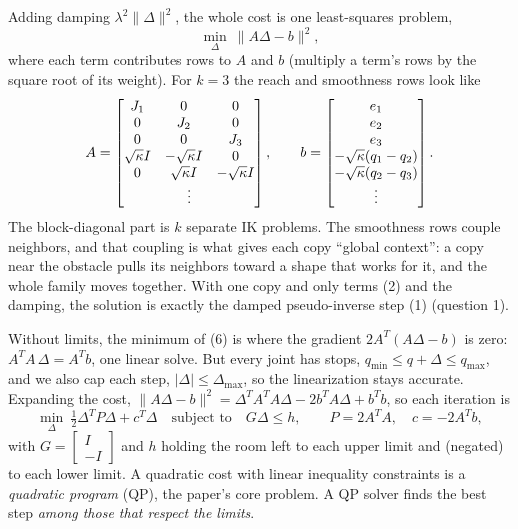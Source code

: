Adding damping $\lambda^2\|\Delta\|^2$, the whole cost is one least-squares
problem,
\begin{equation}
\min_{\Delta}\ \|A\Delta-b\|^2 ,
\end{equation}
where each term contributes rows to $A$ and $b$ (multiply a term's rows by
the square root of its weight). For $k=3$ the reach and smoothness rows look
like
\[
A=\begin{bmatrix}
J_1&0&0\\0&J_2&0\\0&0&J_3\\
\sqrt{\kappa}I&-\sqrt{\kappa}I&0\\
0&\sqrt{\kappa}I&-\sqrt{\kappa}I\\
\multicolumn{3}{c}{\vdots}
\end{bmatrix},\qquad
b=\begin{bmatrix}e_1\\e_2\\e_3\\-\sqrt{\kappa}(q_1-q_2)\\-\sqrt{\kappa}(q_2-q_3)\\\vdots\end{bmatrix}.
\]
The block-diagonal part is $k$ separate IK problems. The smoothness rows
couple neighbors, and that coupling is what gives each copy ``global
context'': a copy near the obstacle pulls its neighbors toward a shape that
works for it, and the whole family moves together. With one copy and only
terms (2) and the damping, the solution is exactly the damped pseudo-inverse
step (1) (question 1).

Without limits, the minimum of (6) is where the gradient
$2A^T(A\Delta-b)$ is zero: $A^TA\,\Delta=A^Tb$, one linear solve. But every
joint has stops, $q_{\min}\le q+\Delta\le q_{\max}$, and we also cap each
step, $|\Delta|\le\Delta_{\max}$, so the linearization stays accurate.
Expanding the cost,
$\|A\Delta-b\|^2=\Delta^TA^TA\Delta-2b^TA\Delta+b^Tb$, so each iteration is
\begin{equation}
\min_{\Delta}\ \tfrac12\Delta^TP\Delta+c^T\Delta
\quad\text{subject to}\quad G\Delta\le h,
\qquad P=2A^TA,\quad c=-2A^Tb,
\end{equation}
with $G=\left[\begin{smallmatrix}I\\-I\end{smallmatrix}\right]$ and $h$
holding the room left to each upper limit and (negated) to each lower
limit. A quadratic cost with linear inequality constraints is a
\emph{quadratic program} (QP), the paper's core problem. A QP solver finds
the best step \emph{among those that respect the limits}.

